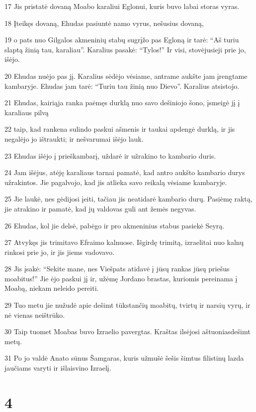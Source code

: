 \par 17 Jis pristatė dovaną Moabo karaliui Eglonui, kuris buvo labai storas vyras. 
\par 18 Įteikęs dovaną, Ehudas pasiuntė namo vyrus, nešusius dovaną, 
\par 19 o pats nuo Gilgalos akmeninių stabų sugrįžo pas Egloną ir tarė: “Aš turiu slaptą žinią tau, karaliau”. Karalius pasakė: “Tylos!” Ir visi, stovėjusieji prie jo, išėjo. 
\par 20 Ehudas nuėjo pas jį. Karalius sėdėjo vėsiame, antrame aukšte jam įrengtame kambaryje. Ehudas jam tarė: “Turiu tau žinią nuo Dievo”. Karalius atsistojo. 
\par 21 Ehudas, kairiąja ranka paėmęs durklą nuo savo dešiniojo šono, įsmeigė jį į karaliaus pilvą 
\par 22 taip, kad rankena sulindo paskui ašmenis ir taukai apdengė durklą, ir jis negalėjo jo ištraukti; ir nešvarumai išėjo lauk. 
\par 23 Ehudas išėjo į prieškambarį, uždarė ir užrakino to kambario duris. 
\par 24 Jam išėjus, atėję karaliaus tarnai pamatė, kad antro aukšto kambario durys užrakintos. Jie pagalvojo, kad jis atlieka savo reikalą vėsiame kambaryje. 
\par 25 Jie laukė, nes gėdijosi įeiti, tačiau jis neatidarė kambario durų. Pasiėmę raktą, jie atrakino ir pamatė, kad jų valdovas guli ant žemės negyvas. 
\par 26 Ehudas, kol jie delsė, pabėgo ir pro akmeninius stabus pasiekė Seyrą. 
\par 27 Atvykęs jis trimitavo Efraimo kalnuose. Išgirdę trimitą, izraelitai nuo kalnų rinkosi prie jo, ir jis jiems vadovavo. 
\par 28 Jis įsakė: “Sekite mane, nes Viešpats atidavė į jūsų rankas jūsų priešus moabitus!” Jie ėjo paskui jį ir, užėmę Jordano brastas, kuriomis pereinama į Moabą, niekam neleido pereiti. 
\par 29 Tuo metu jie nužudė apie dešimt tūkstančių moabitų, tvirtų ir narsių vyrų, ir nė vienas neištrūko. 
\par 30 Taip tuomet Moabas buvo Izraelio pavergtas. Kraštas ilsėjosi aštuoniasdešimt metų. 
\par 31 Po jo valdė Anato sūnus Šamgaras, kuris užmušė šešis šimtus filistinų lazda jaučiams varyti ir išlaisvino Izraelį.



\chapter{4}

